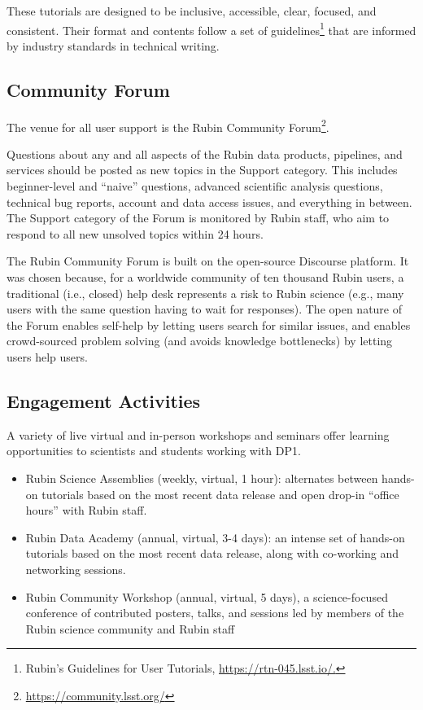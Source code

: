 These tutorials are designed to be inclusive, accessible, clear, focused, and consistent.
Their format and contents follow a set of guidelines\footnote{Rubin's Guidelines for User Tutorials, \url{https://rtn-045.lsst.io/.}} that are informed by industry standards in technical writing.


\subsection{Community Forum
\label{ssec:forum}}

The venue for all user support is the Rubin Community Forum\footnote{\url{https://community.lsst.org/}}.

Questions about any and all aspects of the Rubin data products, pipelines, and services should be posted as new topics in the Support category.
This includes beginner-level and ``naive'' questions, advanced scientific analysis questions, technical bug reports, account and data access issues, and everything in between.
The Support category of the Forum is monitored by Rubin staff, who aim to respond to all new unsolved topics within 24 hours.

The Rubin Community Forum is built on the open-source Discourse platform.
It was chosen because, for a worldwide community of ten thousand Rubin users, a traditional (i.e., closed) help desk represents a risk to Rubin science (e.g., many users with the same question having to wait for responses).
The open nature of the Forum enables self-help by letting users search for similar issues, and enables crowd-sourced problem solving (and avoids knowledge bottlenecks) by letting users help users.


\subsection{Engagement Activities
\label{ssec:engagement}}

A variety of live virtual and in-person workshops and seminars offer learning opportunities to scientists and students working with DP1.

\begin{itemize}
\item Rubin Science Assemblies (weekly, virtual, 1 hour): alternates between hands-on tutorials based on the most recent data release and open drop-in ``office hours'' with Rubin staff.
\item Rubin Data Academy (annual, virtual, 3-4 days): an intense set of hands-on tutorials based on the most recent data release, along with co-working and networking sessions.
\item Rubin Community Workshop (annual, virtual, 5 days), a science-focused conference of contributed posters, talks, and sessions led by members of the Rubin science community and Rubin staff
\end{itemize}

